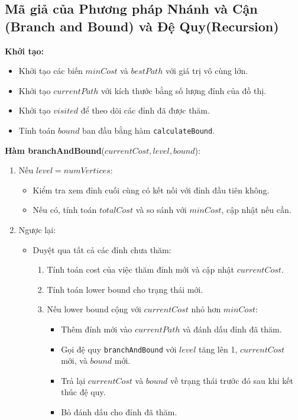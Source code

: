 \documentclass[a4paper]{article}
\begin{document}
 \subsection{Mã giả của Phương pháp Nhánh và Cận (Branch and Bound) và Đệ Quy(Recursion) }\label{control}
 \textbf{Khởi tạo:}
\begin{itemize}
  \item Khởi tạo các biến $minCost$ và $bestPath$ với giá trị vô cùng lớn.
  \item Khởi tạo $currentPath$ với kích thước bằng số lượng đỉnh của đồ thị.
  \item Khởi tạo $visited$ để theo dõi các đỉnh đã được thăm.
  \item Tính toán $bound$ ban đầu bằng hàm \texttt{calculateBound}.
\end{itemize}
\label{control}
\textbf{Hàm branchAndBound}($currentCost, level, bound$):
\begin{enumerate}
  \item Nếu $level = numVertices$:
  \begin{itemize}
    \item Kiểm tra xem đỉnh cuối cùng có kết nối với đỉnh đầu tiên không.
    \item Nếu có, tính toán $totalCost$ và so sánh với $minCost$, cập nhật nếu cần.
  \end{itemize}
  \item Ngược lại:
  \begin{itemize}
    \item Duyệt qua tất cả các đỉnh chưa thăm:
    \begin{enumerate}
      \item Tính toán cost của việc thăm đỉnh mới và cập nhật $currentCost$.
      \item Tính toán lower bound cho trạng thái mới.
      \item Nếu lower bound cộng với $currentCost$ nhỏ hơn $minCost$:
      \begin{itemize}
        \item Thêm đỉnh mới vào $currentPath$ và đánh dấu đỉnh đã thăm.
        \item Gọi đệ quy \texttt{branchAndBound} với $level$ tăng lên 1, $currentCost$ mới, và $bound$ mới.
        \item Trả lại $currentCost$ và $bound$ về trạng thái trước đó sau khi kết thúc đệ quy.
        \item Bỏ đánh dấu cho đỉnh đã thăm.
      \end{itemize}
    \end{enumerate}
  \end{itemize}
\end{enumerate}
\end{document}
